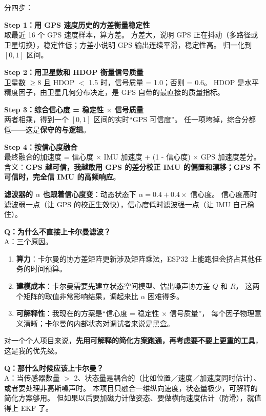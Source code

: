 \documentclass[UTF8,11pt,a4paper]{ctexart}
\begin{document}
\begin{candidate}
分四步：

\medskip
\textbf{Step 1：用 GPS 速度历史的方差衡量稳定性}\\
取最近 16 个 GPS 速度样本，算方差。
方差大，说明 GPS 正在抖动（多路径或卫星切换），稳定性低；方差小说明 GPS 输出连续平滑，稳定性高。
归一化到 $[0,1]$ 区间。

\medskip
\textbf{Step 2：用卫星数和 HDOP 衡量信号质量}\\
卫星数 $\ge 8$ 且 HDOP $<$ 1.5 时，信号质量 = 1.0；否则 = 0.6。
HDOP 是水平精度因子，由卫星几何分布决定，是 GPS 自带的最直接的质量指标。

\medskip
\textbf{Step 3：综合信心度 = 稳定性 $\times$ 信号质量}\\
两者相乘，得到一个 $[0,1]$ 区间的实时``GPS 可信度''。
任一项垮掉，综合分都低——这是\textbf{保守的与逻辑}。

\medskip
\textbf{Step 4：按信心度融合}\\
最终融合的加速度 = 信心度 $\times$ IMU 加速度 + (1 - 信心度) $\times$ GPS 加速度差分。
含义：\textbf{GPS 越可信，我越敢用 GPS 的差分校正 IMU 的偏置和漂移；GPS 不可信时，完全信 IMU 的高频响应}。

\medskip
\textbf{滤波器的 $\alpha$ 也跟着信心度变}：动态状态下 $\alpha = 0.4 + 0.4 \times$ 信心度。
信心度高时滤波弱一点（让 GPS 的校正生效快），信心度低时滤波强一点（让 IMU 自己稳住）。
\end{candidate}

\begin{followup}
\textbf{Q：为什么不直接上卡尔曼滤波？}\\
A：三个原因。
\begin{enumerate}[leftmargin=1.4em,topsep=2pt,itemsep=2pt]
  \item \textbf{算力}：卡尔曼的协方差矩阵更新涉及矩阵乘法，ESP32 上能跑但会挤占其他任务的时间预算。
  \item \textbf{建模成本}：卡尔曼需要先建立状态空间模型、估出噪声协方差 $Q$ 和 $R$，
        这两个矩阵的取值非常影响结果，调起来比 $\alpha$ 困难得多。
  \item \textbf{可解释性}：我现在的方案是``信心度 = 稳定性 $\times$ 信号质量''，
        每个因子物理意义清晰；卡尔曼的内部状态对调试者来说是黑盒。
\end{enumerate}
对一个个人项目来说，\textbf{先用可解释的简化方案跑通，再考虑要不要上更重的工具}，这是我的优先级。

\medskip
\textbf{Q：那什么时候应该上卡尔曼？}\\
A：当传感器数量 $>$ 2、状态量是耦合的（比如位置／速度／加速度同时估计）、或者要处理非高斯噪声时。
本项目只融合一维纵向速度，状态量极少，可解释的简化方案够用。
但如果以后要加磁力计做姿态、要做横向速度估计（防滑），就值得上 EKF 了。
\end{followup}
\end{document}
